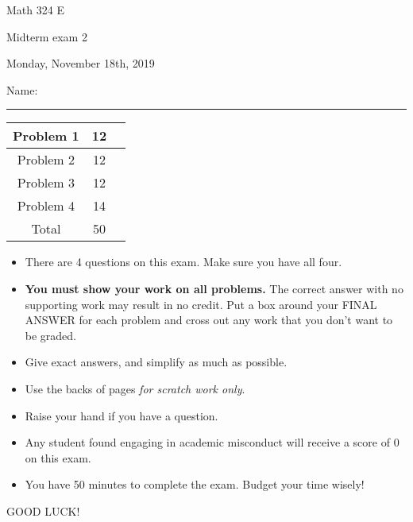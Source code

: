 \documentclass[12 pt]{report}
\begin{document}
\noindent \vfill \noindent \large

\centerline{Math 324 E}

\centerline{Midterm exam 2}

\centerline{Monday, November 18th, 2019}

\normalsize

\vfill
\medskip
Name: \rule{10cm}{1pt}

\bigskip

\vfill
\begin{center}
{\large
\begin{tabular}{||c|c|r||}
\hline Problem 1 & 12 & \hspace{10mm} \hfill \\
\hline Problem 2 & 12 & \hspace{10mm} \hfill \\
\hline Problem 3 & 12 & \hspace{10mm} \hfill \\
\hline Problem 4 & 14 & \hspace{10mm} \hfill \\
\hline Total & 50 & \hspace{10mm} \hfill \\
\hline
\end{tabular}
}
\end{center}
\vfill
\begin{itemize}
\item There are 4 questions on this exam. Make sure you have all four.
\item \textbf{You must show your work on all problems.}  The correct answer
with no supporting work may result in no credit. Put a box
around your FINAL ANSWER for each problem and cross out any work
that you don't want to be graded.
\item Give exact answers, and simplify as much as possible. 
\item Use the backs of pages \textit{for scratch work only}.
\item Raise your hand if you have a question.
\item Any student found engaging in academic misconduct will receive
a score of 0 on this exam.
\item You have 50 minutes to complete the exam.  Budget your time wisely! \\
\end{itemize}
\vfill
\begin{center}GOOD LUCK!\end{center}
\end{document}
